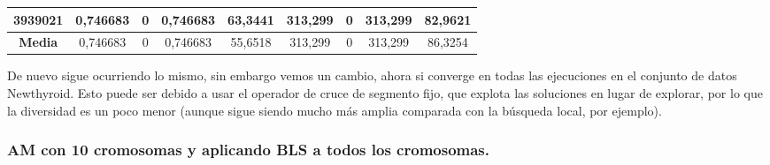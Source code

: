 \documentclass[12pt, spanish]{article}
\begin{document}
\begin{table}[H]
\begin{tabular}{|c|c|c|c|c|c|c|c|c|}
3939021           & 0,746683                  & 0                           & 0,746683               & 63,3441    & 313,299                   & 0                           & 313,299                & 82,9621    \\ \hline
\textbf{Media}    & 0,746683                  & 0                           & 0,746683               & 55,6518    & 313,299                   & 0                           & 313,299                & 86,3254    \\ \hline
\end{tabular}
\end{table}

De nuevo sigue ocurriendo lo mismo, sin embargo vemos un cambio, ahora si converge en todas las ejecuciones en el conjunto de datos Newthyroid. Esto puede ser debido a usar el operador de cruce de segmento fijo, que explota las soluciones en lugar de explorar, por lo que la diversidad es un poco menor (aunque sigue siendo mucho más amplia comparada con la búsqueda local, por ejemplo).

\subsubsection{AM con 10 cromosomas y aplicando BLS a todos los cromosomas.}
\end{document}
